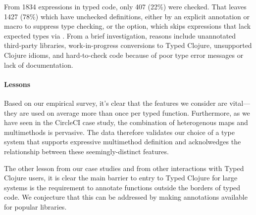 From 1834  expressions in typed code,
only 407 (22\%) were checked.
That leaves 1427 (78\%) which have unchecked definitions, either by an explicit  annotation
or  macro to suppress type checking,
or the  option, which skips  expressions
that lack expected types via .
From a brief investigation,
reasons include unannotated third-party libraries,
work-in-progress conversions to Typed Clojure,
unsupported Clojure idioms, 
and hard-to-check code 
because of poor type error messages or lack of documentation.

\paragraph{Lessons}
Based on our empirical survey, it's clear that the features we
consider are vital---they are used on average more than once per typed
function. Furthermore, as we have seen in the CircleCI case study, the
combination of heterogenous maps and multimethods is pervasive. The
data therefore validates our choice of a type system that supports
expressive multimethod definition and acknolwedges the relationship
between these seemingly-distinct features. 

The other lesson from our case studies and from other interactions
with Typed Clojure users, it is clear the main barrier to entry to
Typed Clojure for large systems is the requirement to annotate
functions outside the borders of typed code.  We conjecture that this
can be addressed by making annotations available for popular
libraries.




